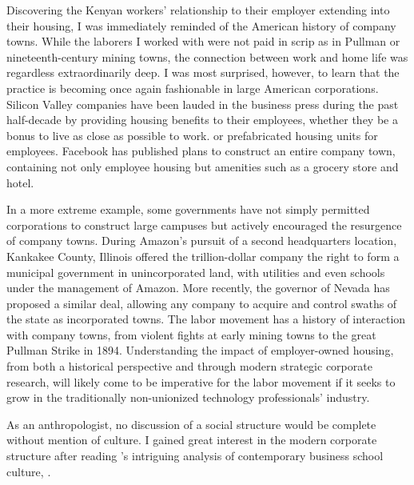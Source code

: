 \begin{adjustwidth}{0.2in}{0.2in}

Discovering the Kenyan workers' relationship to their employer extending into their housing,
I was immediately reminded of the American history of company towns. While the laborers I
worked with were not paid in scrip as in Pullman or nineteenth-century mining towns,
the connection between work and home life was regardless extraordinarily deep.
I was most surprised, however, to learn that the practice is becoming once again fashionable
in large American corporations. Silicon Valley companies have been lauded in the business
press during the past half-decade by providing housing benefits to their employees,
whether they be a bonus to live as close as possible to work. %
or prefabricated housing units for employees. %
Facebook has published plans to construct an entire company town,
containing not only employee housing but amenities such as a grocery store and
hotel. %

In a more extreme example, some governments have not simply permitted corporations
to construct large campuses but actively encouraged the resurgence of company towns.
During Amazon's pursuit of a second headquarters location, Kankakee County, Illinois
offered the trillion-dollar company the right to form a municipal government in
unincorporated land, with utilities and even schools under the management of
Amazon. %
More recently, the governor of Nevada has proposed a similar deal, allowing any
company to acquire and control swaths of the state as incorporated towns. %
The labor movement has a history of interaction with company towns, from violent fights at 
early mining towns to the great Pullman Strike in 1894. 
Understanding the impact of employer-owned housing, from both a historical perspective and
through modern strategic corporate research, will likely come to be imperative
for the labor movement if it seeks to grow in the traditionally non-unionized
technology professionals' industry.

As an anthropologist, no discussion of a social structure would
be complete without mention of culture. I gained great interest in
the modern corporate structure after reading 's
intriguing analysis of contemporary business school culture,
.


\end{adjustwidth}
